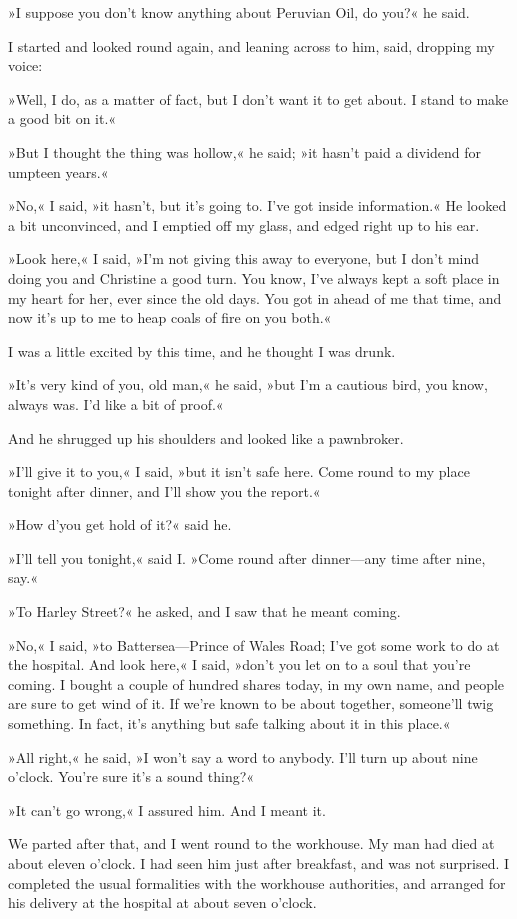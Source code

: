 »I suppose you don't know anything about Peruvian Oil, do you?« he said.

I started and looked round again, and leaning across to him, said, dropping my voice:

»Well, I do, as a matter of fact, but I don't want it to get about. I stand to make a good bit on it.«

»But I thought the thing was hollow,« he said; »it hasn't paid a dividend for umpteen years.«

»No,« I said, »it hasn't, but it's going to. I've got inside information.« He looked a bit unconvinced, and I emptied off my glass, and edged right up to his ear.

»Look here,« I said, »I'm not giving this away to everyone, but I don't mind doing you and Christine a good turn. You know, I've always kept a soft place in my heart for her, ever since the old days. You got in ahead of me that time, and now it's up to me to heap coals of fire on you both.«

I was a little excited by this time, and he thought I was drunk.

»It's very kind of you, old man,« he said, »but I'm a cautious bird, you know, always was. I'd like a bit of proof.«

And he shrugged up his shoulders and looked like a pawnbroker.

»I'll give it to you,« I said, »but it isn't safe here. Come round to my place tonight after dinner, and I'll show you the report.«

»How d'you get hold of it?« said he.

»I'll tell you tonight,« said I. »Come round after dinner—any time after nine, say.«

»To Harley Street?« he asked, and I saw that he meant coming.

»No,« I said, »to Battersea—Prince of Wales Road; I've got some work to do at the hospital. And look here,« I said, »don't you let on to a soul that you're coming. I bought a couple of hundred shares today, in my own name, and people are sure to get wind of it. If we're known to be about together, someone'll twig something. In fact, it's anything but safe talking about it in this place.«

»All right,« he said, »I won't say a word to anybody. I'll turn up about nine o'clock. You're sure it's a sound thing?«

»It can't go wrong,« I assured him. And I meant it.

We parted after that, and I went round to the workhouse. My man had died at about eleven o'clock. I had seen him just after breakfast, and was not surprised. I completed the usual formalities with the workhouse authorities, and arranged for his delivery at the hospital at about seven o'clock.

